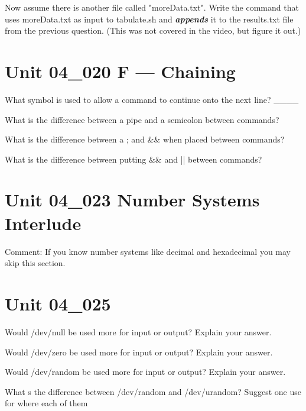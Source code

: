 \documentclass[letterpaper,12pt]{exam}
\newcommand{\unit}{Unit 04}
\begin{document}
\begin {questions}
\begin{samepage}
	\question Now assume there is another file called "moreData.txt".  Write the command that uses moreData.txt as input to tabulate.sh and \textbf{\textit{appends}} it to the results.txt file from the previous question.  (This was not covered in the video, but figure it out.)
	\vspace{5mm}
\end{samepage}

\section*{\unit\_020 F --- Chaining} %

\question What symbol is used to allow a command to continue onto the next line? \_\_\_\_

\question What is the difference between a pipe and a semicolon between commands?
\vspace{5 mm}

\question What is the difference between a ; and \&\& when placed between commands?
\vspace{5mm}

\question What is the difference between putting \&\& and || between commands?
\section*{\unit\_023 Number Systems Interlude} %

Comment:  If you know number systems like decimal and hexadecimal you may skip this section.

\section*{\unit\_025} %

\begin{samepage}
	\question Would /dev/null be used more for input or output?  Explain your answer.
	\vspace{5mm}

	\question Would /dev/zero be used more for input or output?  Explain your answer.
	\vspace{5mm}

	\question Would /dev/random be used more for input or output?  Explain your answer.
	\vspace{5mm}

	\question What s the difference between /dev/random and /dev/urandom?  Suggest one use for where each of them
	\vspace{5mm}


\end{samepage}
\end{questions}
\end{document}
